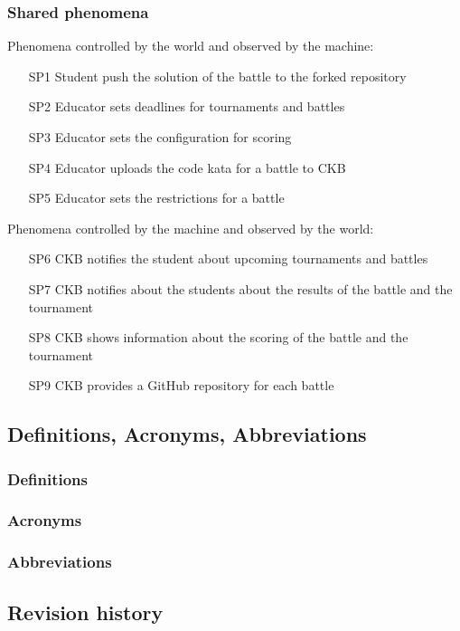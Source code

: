 \subsubsection{Shared phenomena}
Phenomena controlled by the world and observed by the machine:
\begin{itemize}
    \item[SP1] Student push the solution of the battle to the forked repository
    \item[SP2] Educator sets deadlines for tournaments and battles
    \item[SP3] Educator sets the configuration for scoring
    \item[SP4] Educator uploads the code kata for a battle to CKB
    \item[SP5] Educator sets the restrictions for a battle    
\end{itemize}
Phenomena controlled by the machine and observed by the world:
\begin{itemize}
    \item[SP6] CKB notifies the student about upcoming tournaments and battles
    \item[SP7] CKB notifies about the students about the results of the battle and the tournament
    \item[SP8] CKB shows information about the scoring of the battle and the tournament
    \item[SP9] CKB provides a GitHub repository for each battle
\end{itemize}

\subsection{Definitions, Acronyms, Abbreviations}
\subsubsection{Definitions}
\subsubsection{Acronyms}
\subsubsection{Abbreviations}

\subsection{Revision history}

